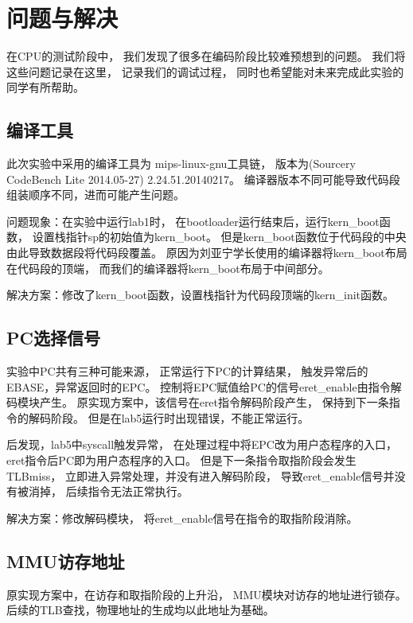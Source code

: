 \section{问题与解决}
    在CPU的测试阶段中，%
    我们发现了很多在编码阶段比较难预想到的问题。%
    我们将这些问题记录在这里，%
    记录我们的调试过程，%
    同时也希望能对未来完成此实验的同学有所帮助。

    \subsection{编译工具}
        此次实验中采用的编译工具为%
        mips-linux-gnu工具链，%
        版本为(Sourcery CodeBench Lite 2014.05-27)%
        2.24.51.20140217。%
        编译器版本不同可能导致代码段组装顺序不同，进而可能产生问题。%

        问题现象：在实验中运行lab1时，%
        在bootloader运行结束后，运行kern\_boot函数，%
        设置栈指针sp的初始值为kern\_boot。%
        但是kern\_boot函数位于代码段的中央%
        由此导致数据段将代码段覆盖。%
        原因为刘亚宁学长使用的编译器将kern\_boot布局在代码段的顶端，%
        而我们的编译器将kern\_boot布局于中间部分。%

        解决方案：修改了kern\_boot函数，设置栈指针为代码段顶端的kern\_init函数。

    \subsection{PC选择信号}
        实验中PC共有三种可能来源，%
        正常运行下PC的计算结果，%
        触发异常后的EBASE，异常返回时的EPC。%
        控制将EPC赋值给PC的信号eret\_enable由指令解码模块产生。%
        原实现方案中，该信号在eret指令解码阶段产生，%
        保持到下一条指令的解码阶段。%
        但是在lab5运行时出现错误，不能正常运行。%

        后发现，lab5中syscall触发异常，%
        在处理过程中将EPC改为用户态程序的入口，%
        eret指令后PC即为用户态程序的入口。%
        但是下一条指令取指阶段会发生TLBmiss，%
        立即进入异常处理，并没有进入解码阶段，%
        导致eret\_enable信号并没有被消掉，%
        后续指令无法正常执行。

        解决方案：修改解码模块，%
        将eret\_enable信号在指令的取指阶段消除。

    \subsection{MMU访存地址}
        原实现方案中，在访存和取指阶段的上升沿，%
        MMU模块对访存的地址进行锁存。%
        后续的TLB查找，物理地址的生成均以此地址为基础。

